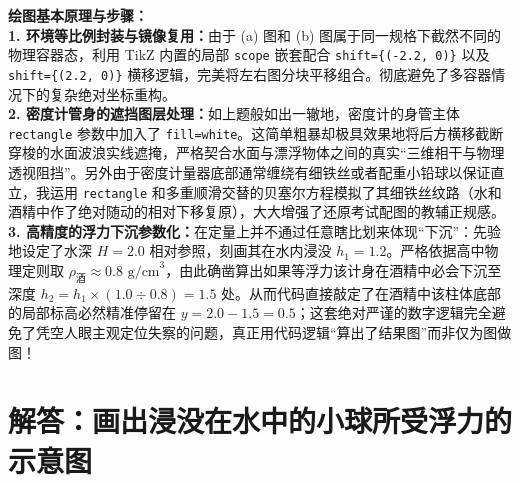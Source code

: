 \documentclass[12pt, a4paper]{ctexrep}
\begin{document}
{\small\color{blue!70!black}
\textbf{绘图基本原理与步骤：}\\
\textbf{1. 环境等比例封装与镜像复用：}由于 (a) 图和 (b) 图属于同一规格下截然不同的物理容器态，利用 TikZ 内置的局部 \texttt{scope} 嵌套配合 \texttt{shift=\{(-2.2, 0)\}} 以及 \texttt{shift=\{(2.2, 0)\}} 横移逻辑，完美将左右图分块平移组合。彻底避免了多容器情况下的复杂绝对坐标重构。\\
\textbf{2. 密度计管身的遮挡图层处理：}如上题般如出一辙地，密度计的身管主体 \texttt{rectangle} 参数中加入了 \texttt{fill=white}。这简单粗暴却极具效果地将后方横移截断穿梭的水面波浪实线遮掩，严格契合水面与漂浮物体之间的真实“三维相干与物理透视阻挡”。另外由于密度计量器底部通常缠绕有细铁丝或者配重小铅球以保证直立，我运用 \texttt{rectangle} 和多重顺滑交替的贝塞尔方程模拟了其细铁丝纹路（水和酒精中作了绝对随动的相对下移复原），大大增强了还原考试配图的教辅正规感。\\
\textbf{3. 高精度的浮力下沉参数化：}在定量上并不通过任意瞎比划来体现“下沉”：先验地设定了水深 $H=2.0$ 相对参照，刻画其在水内浸没 $h_1 = 1.2$。严格依据高中物理定则取 $\rho_{\text{酒}} \approx 0.8\text{ g/cm}^3$，由此确凿算出如果等浮力该计身在酒精中必会下沉至深度 $h_2 = h_1 \times (1.0 \div 0.8) = 1.5$ 处。从而代码直接敲定了在酒精中该柱体底部的局部标高必然精准停留在 $y = 2.0 - 1.5 = 0.5$；这套绝对严谨的数字逻辑完全避免了凭空人眼主观定位失察的问题，真正用代码逻辑“算出了结果图”而非仅为图做图！
}

\vspace{1.0cm}


\section{解答：画出浸没在水中的小球所受浮力的示意图}

\vspace{0.6cm}
\end{document}
